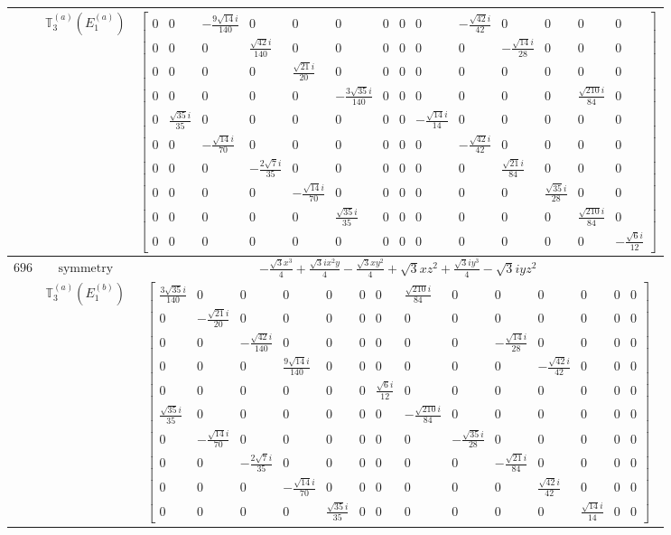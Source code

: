 \documentclass[fleqn,8pt,landscape]{jsarticle}
\begin{document}
\begin{longtable}{ccc}
$  $ & $ \mathbb{T}_{3}^{(a)}(E_{1}^{(a)}) $ & $ \begin{bmatrix} 0 & 0 & - \frac{9 \sqrt{14} i}{140} & 0 & 0 & 0 & 0 & 0 & 0 & - \frac{\sqrt{42} i}{42} & 0 & 0 & 0 & 0 \\ 0 & 0 & 0 & \frac{\sqrt{42} i}{140} & 0 & 0 & 0 & 0 & 0 & 0 & - \frac{\sqrt{14} i}{28} & 0 & 0 & 0 \\ 0 & 0 & 0 & 0 & \frac{\sqrt{21} i}{20} & 0 & 0 & 0 & 0 & 0 & 0 & 0 & 0 & 0 \\ 0 & 0 & 0 & 0 & 0 & - \frac{3 \sqrt{35} i}{140} & 0 & 0 & 0 & 0 & 0 & 0 & \frac{\sqrt{210} i}{84} & 0 \\ 0 & \frac{\sqrt{35} i}{35} & 0 & 0 & 0 & 0 & 0 & 0 & - \frac{\sqrt{14} i}{14} & 0 & 0 & 0 & 0 & 0 \\ 0 & 0 & - \frac{\sqrt{14} i}{70} & 0 & 0 & 0 & 0 & 0 & 0 & - \frac{\sqrt{42} i}{42} & 0 & 0 & 0 & 0 \\ 0 & 0 & 0 & - \frac{2 \sqrt{7} i}{35} & 0 & 0 & 0 & 0 & 0 & 0 & \frac{\sqrt{21} i}{84} & 0 & 0 & 0 \\ 0 & 0 & 0 & 0 & - \frac{\sqrt{14} i}{70} & 0 & 0 & 0 & 0 & 0 & 0 & \frac{\sqrt{35} i}{28} & 0 & 0 \\ 0 & 0 & 0 & 0 & 0 & \frac{\sqrt{35} i}{35} & 0 & 0 & 0 & 0 & 0 & 0 & \frac{\sqrt{210} i}{84} & 0 \\ 0 & 0 & 0 & 0 & 0 & 0 & 0 & 0 & 0 & 0 & 0 & 0 & 0 & - \frac{\sqrt{6} i}{12} \end{bmatrix} $ \\ \hline
$ 696 $ & $ \text{symmetry} $ & $ - \frac{\sqrt{3} x^{3}}{4} + \frac{\sqrt{3} i x^{2} y}{4} - \frac{\sqrt{3} x y^{2}}{4} + \sqrt{3} x z^{2} + \frac{\sqrt{3} i y^{3}}{4} - \sqrt{3} i y z^{2} $ \\
$  $ & $ \mathbb{T}_{3}^{(a)}(E_{1}^{(b)}) $ & $ \begin{bmatrix} \frac{3 \sqrt{35} i}{140} & 0 & 0 & 0 & 0 & 0 & 0 & \frac{\sqrt{210} i}{84} & 0 & 0 & 0 & 0 & 0 & 0 \\ 0 & - \frac{\sqrt{21} i}{20} & 0 & 0 & 0 & 0 & 0 & 0 & 0 & 0 & 0 & 0 & 0 & 0 \\ 0 & 0 & - \frac{\sqrt{42} i}{140} & 0 & 0 & 0 & 0 & 0 & 0 & - \frac{\sqrt{14} i}{28} & 0 & 0 & 0 & 0 \\ 0 & 0 & 0 & \frac{9 \sqrt{14} i}{140} & 0 & 0 & 0 & 0 & 0 & 0 & - \frac{\sqrt{42} i}{42} & 0 & 0 & 0 \\ 0 & 0 & 0 & 0 & 0 & 0 & \frac{\sqrt{6} i}{12} & 0 & 0 & 0 & 0 & 0 & 0 & 0 \\ \frac{\sqrt{35} i}{35} & 0 & 0 & 0 & 0 & 0 & 0 & - \frac{\sqrt{210} i}{84} & 0 & 0 & 0 & 0 & 0 & 0 \\ 0 & - \frac{\sqrt{14} i}{70} & 0 & 0 & 0 & 0 & 0 & 0 & - \frac{\sqrt{35} i}{28} & 0 & 0 & 0 & 0 & 0 \\ 0 & 0 & - \frac{2 \sqrt{7} i}{35} & 0 & 0 & 0 & 0 & 0 & 0 & - \frac{\sqrt{21} i}{84} & 0 & 0 & 0 & 0 \\ 0 & 0 & 0 & - \frac{\sqrt{14} i}{70} & 0 & 0 & 0 & 0 & 0 & 0 & \frac{\sqrt{42} i}{42} & 0 & 0 & 0 \\ 0 & 0 & 0 & 0 & \frac{\sqrt{35} i}{35} & 0 & 0 & 0 & 0 & 0 & 0 & \frac{\sqrt{14} i}{14} & 0 & 0 \end{bmatrix} $ \\ \hline

\end{longtable}
\end{document}
